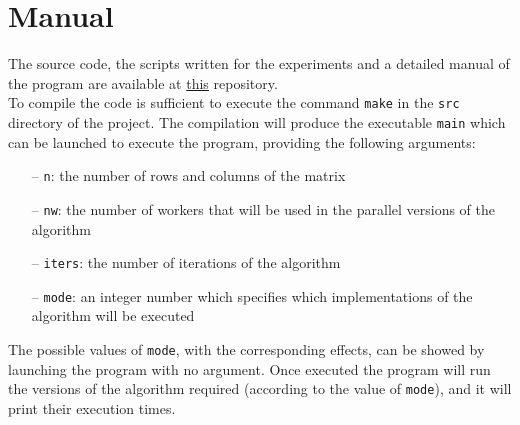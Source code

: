 \documentclass[12pt]{article}
\begin{document}
	\section{Manual}
	The source code, the scripts written for the experiments and a detailed manual of the program are available at \href{https://github.com/DiegoArcelli/Parallel-And-Distributed-Systems-Project}{this} repository.\\ 
	To compile the code is sufficient to execute the command \verb*|make| in the \verb*|src| directory of the project. The compilation will produce the executable \verb*|main| which can be launched to execute the program, providing the following arguments:
	\begin{itemize}
		\item[--] \verb|n|: the number of rows and columns of the matrix
		\item[--] \verb|nw|: the number of workers that will be used in the parallel versions of the algorithm
		\item[--] \verb|iters|: the number of iterations of the algorithm
		\item[--] \verb|mode|: an integer number which specifies which implementations of the algorithm will be executed
	\end{itemize} 
	The possible values of \verb|mode|, with the corresponding effects, can be showed by launching the program with no argument. Once executed the program will run the versions of the algorithm required (according to the value of \verb|mode|), and it will print their execution times. 
	
\end{document}
